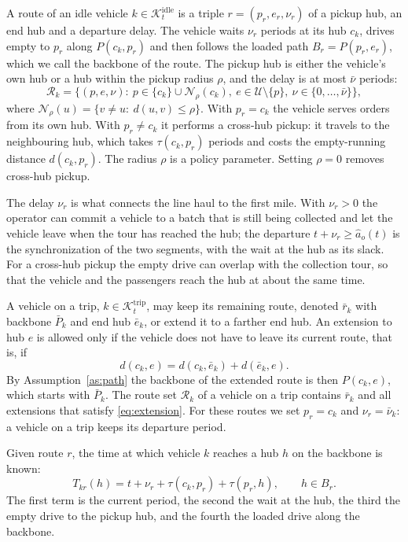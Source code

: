 \documentclass[12pt]{article}
\theoremstyle{plain}
\theoremstyle{definition}
\newcommand{\Kidle}{\mathcal{K}^{\mathrm{idle}}_t}
\newcommand{\Ktrip}{\mathcal{K}^{\mathrm{trip}}_t}
\begin{document}
A route of an idle vehicle $k\in\Kidle$ is a triple $r=(p_r,e_r,\nu_r)$ of a pickup hub, an end hub and a departure delay. The vehicle waits $\nu_r$ periods at its hub $c_k$, drives empty to $p_r$ along $P(c_k,p_r)$ and then follows the loaded path $B_r=P(p_r,e_r)$, which we call the backbone of the route. The pickup hub is either the vehicle's own hub or a hub within the pickup radius $\rho$, and the delay is at most $\bar\nu$ periods:
\begin{equation}\label{eq:routes-idle}
\mathcal{R}_{k}=\bigl\{(p,e,\nu):\ p\in\{c_k\}\cup\mathcal{N}_\rho(c_k),\ e\in\mathcal{U}\setminus\{p\},\ \nu\in\{0,\dots,\bar\nu\}\bigr\},
\end{equation}
where $\mathcal{N}_\rho(u)=\{v\neq u:\ d(u,v)\le\rho\}$. With $p_r=c_k$ the vehicle serves orders from its own hub. With $p_r\neq c_k$ it performs a cross-hub pickup: it travels to the neighbouring hub, which takes $\tau(c_k,p_r)$ periods and costs the empty-running distance $d(c_k,p_r)$. The radius $\rho$ is a policy parameter. Setting $\rho=0$ removes cross-hub pickup.

The delay $\nu_r$ is what connects the line haul to the first mile. With $\nu_r>0$ the operator can commit a vehicle to a batch that is still being collected and let the vehicle leave when the tour has reached the hub; the departure $t+\nu_r\ge\hat a_o(t)$ is the synchronization of the two segments, with the wait at the hub as its slack. For a cross-hub pickup the empty drive can overlap with the collection tour, so that the vehicle and the passengers reach the hub at about the same time.

A vehicle on a trip, $k\in\Ktrip$, may keep its remaining route, denoted $\bar r_k$ with backbone $\bar P_k$ and end hub $\bar e_k$, or extend it to a farther end hub. An extension to hub $e$ is allowed only if the vehicle does not have to leave its current route, that is, if
\begin{equation}\label{eq:extension}
d(c_k,e)=d(c_k,\bar e_k)+d(\bar e_k,e).
\end{equation}
By Assumption~\ref{as:path} the backbone of the extended route is then $P(c_k,e)$, which starts with $\bar P_k$. The route set $\mathcal{R}_k$ of a vehicle on a trip contains $\bar r_k$ and all extensions that satisfy \eqref{eq:extension}. For these routes we set $p_r=c_k$ and $\nu_r=\bar\nu_k$: a vehicle on a trip keeps its departure period.

Given route $r$, the time at which vehicle $k$ reaches a hub $h$ on the backbone is known:
\begin{equation}\label{eq:arrival}
T_{kr}(h)=t+\nu_r+\tau(c_k,p_r)+\tau(p_r,h),\qquad h\in B_r.
\end{equation}
The first term is the current period, the second the wait at the hub, the third the empty drive to the pickup hub, and the fourth the loaded drive along the backbone.
\end{document}
